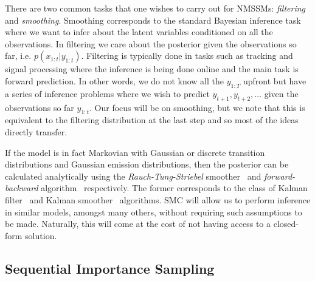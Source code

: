 There are two common tasks that one wishes to carry out for NMSSMs: \emph{filtering} and
\emph{smoothing}.  Smoothing corresponds to the standard Bayesian inference task where we
want to infer about the latent variables conditioned on all the observations.  In filtering
we care about the posterior given the observations
so far, i.e. $p(x_{1:t} | y_{1:t})$.  Filtering is typically done in tasks such as tracking and signal
processing where the inference is being done online and the main task is forward prediction.
In other words, we do not know all the $y_{1:T}$ upfront but have a series of inference problems
where we wish to predict $y_{t+1},y_{t+2},\dots$ given the observations so far $y_{1:t}$.  Our
focus will be on smoothing, but we note that this is equivalent to the filtering distribution
at the last step and so most of the ideas directly transfer.

If the model is in fact Markovian with Gaussian or discrete transition distributions and Gaussian
emission distributions, then the posterior can be calculated analytically using the \emph{Rauch-Tung-Striebel}
smoother~\citep{rauch1965maximum} and \emph{forward-backward} algorithm~\citep{rabiner1986introduction} respectively.
The former corresponds to the class of Kalman filter~\citep{kalman1960new} and Kalman smoother~\citep{rauch1965maximum}
algorithms.  
SMC will allow us to perform inference in similar models, amongst many others, without requiring
such assumptions to be made.  Naturally, this will come at the cost of not having access to a closed-form solution.

\subsection{Sequential Importance Sampling}
\label{sec:part:smc:sis}

